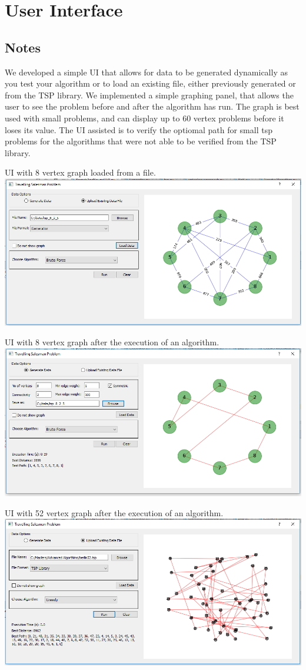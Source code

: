 \documentclass[11pt, english]{article}
\begin{document}
\section{User Interface}
\subsection{Notes}
We developed a simple UI that allows for data to be generated dynamically as you test your algorithm or to load an existing file, either previously generated or from the TSP library. 
We implemented a simple graphing panel, that allows the user to see the problem before and after the algorithm has run. The graph is best used with small problems, and can display up to 60 vertex problems before it loses its value.
The UI assisted is to verify the optiomal path for small tsp problems for the algorithms that were not able to be verified from the TSP library.

\begin{center}
UI with 8 vertex graph loaded from a file.
\includegraphics[scale=0.60]{ui2.png}
\end{center}

\begin{center}
UI with 8 vertex graph after the execution of an algorithm.
\includegraphics[scale=0.60]{ui1.png}
\end{center}

\begin{center}
UI with 52 vertex graph after the execution of an algorithm.
\includegraphics[scale=0.60]{ui3.png}
\end{center}




\end{document}
